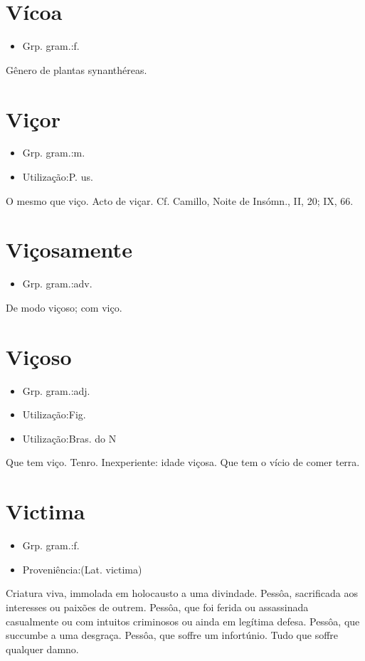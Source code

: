 \documentclass{article}
\begin{document}
\section{Vícoa}
\begin{itemize}
\item {Grp. gram.:f.}
\end{itemize}
Gênero de plantas synanthéreas.
\section{Viçor}
\begin{itemize}
\item {Grp. gram.:m.}
\end{itemize}
\begin{itemize}
\item {Utilização:P. us.}
\end{itemize}
O mesmo que \textunderscore viço\textunderscore .
Acto de viçar. Cf. Camillo, \textunderscore Noite de Insómn.\textunderscore , II, 20; IX, 66.
\section{Viçosamente}
\begin{itemize}
\item {Grp. gram.:adv.}
\end{itemize}
De modo viçoso; com viço.
\section{Viçoso}
\begin{itemize}
\item {Grp. gram.:adj.}
\end{itemize}
\begin{itemize}
\item {Utilização:Fig.}
\end{itemize}
\begin{itemize}
\item {Utilização:Bras. do N}
\end{itemize}
Que tem viço.
Tenro.
Inexperiente: \textunderscore idade viçosa\textunderscore .
Que tem o vício de comer terra.
\section{Victima}
\begin{itemize}
\item {Grp. gram.:f.}
\end{itemize}
\begin{itemize}
\item {Proveniência:(Lat. \textunderscore victima\textunderscore )}
\end{itemize}
Criatura viva, immolada em holocausto a uma divindade.
Pessôa, sacrificada aos interesses ou paixões de outrem.
Pessôa, que foi ferida ou assassinada casualmente ou com intuitos criminosos ou ainda em legítima defesa.
Pessôa, que succumbe a uma desgraça.
Pessôa, que soffre um infortúnio.
Tudo que soffre qualquer damno.
\end{document}
